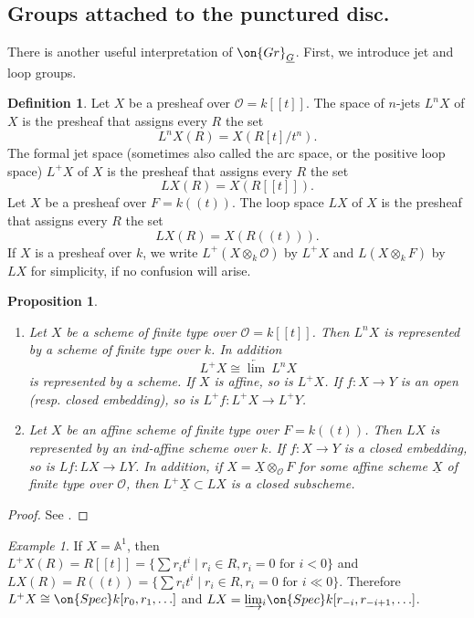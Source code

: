 \documentclass[]{pcmi}
\theoremstyle{plain}
\newtheorem{prop}[equation]{Proposition}
\theoremstyle{remark}
\newtheorem{ex}[equation]{Example}
\theoremstyle{definition}
\newtheorem{dfn}[equation]{Definition}
\newcommand{\bA}{{\mathbb A}}
\newcommand{\mO}{{\mathcal O}}
\newcommand{\Gr}{{\on{Gr}}}
\newcommand{\Spec}{\on{Spec}}
\begin{document}
\subsection{Groups attached to the punctured disc.}
There is another useful interpretation of $\Gr_{\underline G}$. First, we introduce jet and loop groups.
\begin{dfn}
Let $X$ be a presheaf over $\mO=k[[t]]$. The space of $n$-jets $L^nX$ of $X$ is the presheaf that assigns every $R$ the set
$$L^nX(R)=X(R[t]/t^n).$$ 
The formal jet space (sometimes also called the arc space, or the positive loop space) $L^+X$ of $X$ is the presheaf that assigns every $R$ the set 
$$LX(R)=X(R[[t]]).$$ 
Let $X$ be a presheaf over $F=k((t))$. The loop space $LX$ of $X$ is the presheaf that assigns every $R$ the set 
$$LX(R)=X(R((t))).$$
If $X$ is a presheaf over $k$, we write $L^+(X\otimes_k\mO)$ by $L^+X$ and $L(X\otimes_k F)$ by $LX$ for simplicity, if no confusion will arise.
\end{dfn}

\begin{prop}~
\begin{enumerate}
\item Let $X$ be a scheme of finite type over $\mO=k[[t]]$. Then $L^nX$ is represented by a scheme of finite type over $k$. In addition 
$$L^+X\cong \underleftarrow\lim\ L^nX$$ 
is represented by a scheme. If $X$ is affine, so is $L^+X$. If $f:X\to Y$ is an open (resp. closed embedding), so is $L^+f: L^+X\to L^+Y$.

\item Let $X$ be an affine scheme of finite type over $F=k((t))$. Then $LX$ is represented by an ind-affine scheme over $k$. If $f:X\to Y$ is a closed embedding, so is $Lf:LX\to LY$. In addition, if $X=\underline X\otimes_\mO F$ for some affine scheme $\underline X$ of finite type over $\mO$, then $L^+\underline X\subset LX$ is a closed subscheme. 
\end{enumerate}
\end{prop}
\begin{proof}See \cite[1.a]{PR}.
\end{proof}

\begin{ex}If $X=\bA^1$, then $L^+X(R)=R[[t]]=\{\sum r_it^i \mid r_i\in R, r_i=0 \mbox{ for } i<0 \}$ and $LX(R)=R((t))=\{\sum r_it^i\mid  r_i\in R, r_i=0 \mbox{ for } i\ll 0\}$. Therefore $L^+X\cong \Spec k[r_0,r_1,\ldots]$ and $LX=\underrightarrow\lim_i \Spec k[r_{-i}, r_{-i+1},\ldots]$.
\end{ex}
\end{document}
